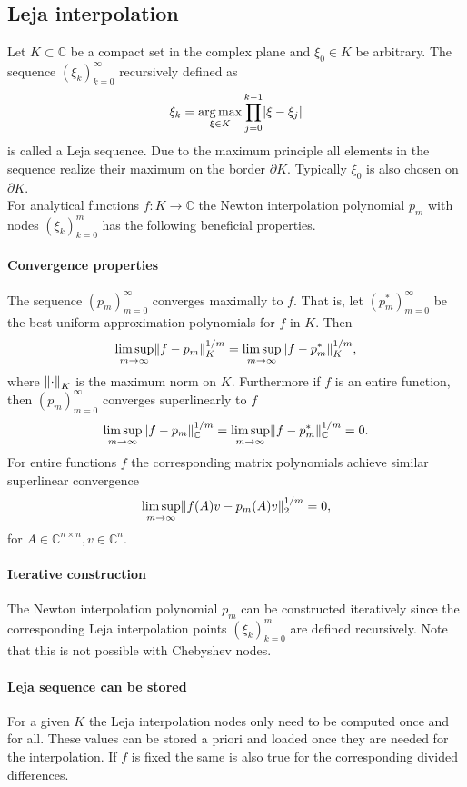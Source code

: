 \documentclass{scrartcl}
\begin{document}
\subsection{Leja interpolation} \label{sec:LejaInterpolation}
	Let $K\subset\mathbb{C}$ be a compact set in the complex plane and $\xi_0\in K$ be arbitrary. The sequence $(\xi_k)_{k=0}^{\infty}$ recursively defined as
	\[\xi_k = \underset{{\xi\in K}}{\operatorname{arg\,max}}\displaystyle\prod_{j=0}^{k-1}\lvert\xi-\xi_j\rvert\]
	is called a Leja sequence. Due to the maximum principle all elements in the sequence realize their maximum on the border $\partial K$. Typically $\xi_0$ is also chosen on $\partial K$.\\
	For analytical functions $f\!:K\to\mathbb{C}$ the Newton interpolation polynomial $p_m$ with nodes $(\xi_k)_{k=0}^{m}$ has the following beneficial properties. 
	\paragraph{Convergence properties}
	The sequence $(p_m)_{m=0}^\infty$ converges maximally to $f$. That is, let $(p_m^{*})_{m=0}^\infty$ be the best uniform approximation polynomials for $f$ in $K$. Then
	\[\limsup\limits_{m \rightarrow \infty}\lVert f-p_m\rVert_{K}^{1/m} = \limsup\limits_{m \rightarrow \infty}\lVert f-p_m^{*}\rVert_{K}^{1/m},\]
	where ${\lVert\cdot\rVert}_K$ is the maximum norm on $K$. Furthermore if $f$ is an entire function, then $(p_m)_{m=0}^\infty$ converges superlinearly to $f$
	\[\limsup\limits_{m \rightarrow \infty}\lVert f-p_m\rVert_{\mathbb{C}}^{1/m} = \limsup\limits_{m \rightarrow \infty}\lVert f-p_m^{*}\rVert_{\mathbb{C}}^{1/m} = 0. \]
	For entire functions $f$ the corresponding matrix polynomials achieve similar superlinear convergence
	\[\limsup\limits_{m \rightarrow \infty}\lVert f(A)v-p_m(A)v\rVert_{2}^{1/m} = 0, \]
	for $A\in\mathbb{C}^{n\times n}, v\in\mathbb{C}^n$.
	
	\paragraph{Iterative construction}
	The Newton interpolation polynomial $p_m$ can be constructed iteratively since the corresponding Leja interpolation points $(\xi_k)_{k=0}^{m}$ are defined recursively. Note that this is not possible with Chebyshev nodes.
	
	\paragraph{Leja sequence can be stored}
	For a given $K$ the Leja interpolation nodes only need to be computed once and for all. These values can be stored a priori and loaded once they are needed for the interpolation. If $f$ is fixed the same is also true for the corresponding divided differences.\\
	
\end{document}

